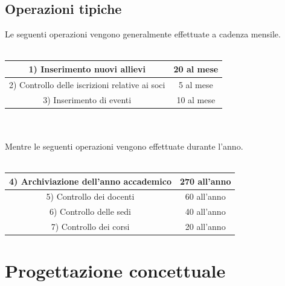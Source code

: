 \documentclass[11pt]{article}
\begin{document}
	\subsection{Operazioni tipiche}
		Le seguenti operazioni vengono generalmente effettuate a cadenza mensile.\\\\
		\begin{tabular}{|c|c|}
			\hline
			1) Inserimento nuovi allievi & 20 al mese\\
			\hline
			2) Controllo delle iscrizioni relative ai soci & 5 al mese\\
			\hline
			3) Inserimento di eventi & 10 al mese\\
			\hline
		\end{tabular}
		\\\\
		Mentre le seguenti operazioni vengono effettuate durante l'anno.\\\\
		\begin{tabular}{|c|c|}
			\hline
			4) Archiviazione dell'anno accademico & 270 all'anno\\
			\hline
			5) Controllo dei docenti & 60 all'anno\\
			\hline
			6) Controllo delle sedi & 40 all'anno\\
			\hline
			7) Controllo dei corsi & 20 all'anno\\
			\hline
		\end{tabular}
\section{Progettazione concettuale}
\end{document}
